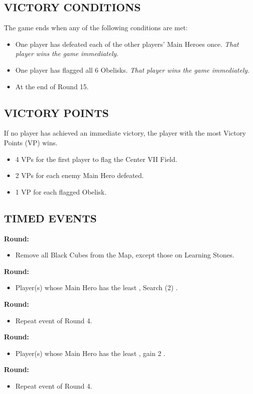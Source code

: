 \begin{multicols*}{2}
\subsection*{\MakeUppercase{Victory Conditions}}
The game ends when any of the following conditions are met:

\begin{itemize}
  \item One player has defeated each of the other players' Main Heroes once. \textit{That player wins the game immediately.}
  \item One player has flagged all 6 Obelisks. \textit{That player wins the game immediately.}
  \item At the end of Round 15.
\end{itemize}

\subsection*{\MakeUppercase{Victory Points}}
If no player has achieved an immediate victory, the player with the most Victory Points (VP) wins.

\begin{itemize}
  \item 4 VPs for the first player to flag the Center VII Field.
  \item 2 VPs for each enemy Main Hero defeated.
  \item 1 VP for each flagged Obelisk.
\end{itemize}

\subsection*{\MakeUppercase{Timed Events}}
\textbf{ Round:}
\begin{itemize}
  \item Remove all Black Cubes from the Map, except those on Learning Stones.
\end{itemize}
\textbf{ Round:}
\begin{itemize}
  \item Player(s) whose Main Hero has the least , Search (2) .
\end{itemize}
\textbf{ Round:}
\begin{itemize}
  \item Repeat event of Round 4.
\end{itemize}
\textbf{ Round:}
\begin{itemize}
  \item Player(s) whose Main Hero has the least , gain 2 .
\end{itemize}
\textbf{ Round:}
\begin{itemize}
  \item Repeat event of Round 4.
\end{itemize}


\end{multicols*}
